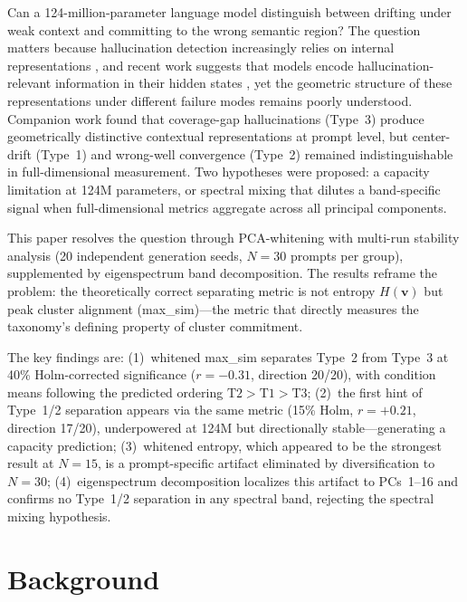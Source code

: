 \documentclass[11pt]{article}
\newcommand{\Hv}{H(\mathbf{v})}
\begin{document}
Can a 124-million-parameter language model distinguish between drifting under weak context and committing to the wrong semantic region? The question matters because hallucination detection increasingly relies on internal representations \citep{tonmoy2024comprehensive, zhang2023siren, kadavath2022language}, and recent work suggests that models encode hallucination-relevant information in their hidden states \citep{duan2024llmsknow}, yet the geometric structure of these representations under different failure modes remains poorly understood. Companion work \citep{author2026induction} found that coverage-gap hallucinations (Type~3) produce geometrically distinctive contextual representations at prompt level, but center-drift (Type~1) and wrong-well convergence (Type~2) remained indistinguishable in full-dimensional measurement. Two hypotheses were proposed: a capacity limitation at 124M parameters, or spectral mixing that dilutes a band-specific signal when full-dimensional metrics aggregate across all principal components.

This paper resolves the question through PCA-whitening with multi-run stability analysis (20 independent generation seeds, $N = 30$ prompts per group), supplemented by eigenspectrum band decomposition. The results reframe the problem: the theoretically correct separating metric is not entropy $\Hv$ but peak cluster alignment (max\_sim)---the metric that directly measures the taxonomy's defining property of cluster commitment.

The key findings are: (1)~whitened max\_sim separates Type~2 from Type~3 at 40\% Holm-corrected significance ($r = -0.31$, direction 20/20), with condition means following the predicted ordering $\text{T2} > \text{T1} > \text{T3}$; (2)~the first hint of Type~1/2 separation appears via the same metric (15\% Holm, $r = +0.21$, direction 17/20), underpowered at 124M but directionally stable---generating a capacity prediction; (3)~whitened entropy, which appeared to be the strongest result at $N = 15$, is a prompt-specific artifact eliminated by diversification to $N = 30$; (4)~eigenspectrum decomposition localizes this artifact to PCs~1--16 and confirms no Type~1/2 separation in any spectral band, rejecting the spectral mixing hypothesis.


\section{Background}
\end{document}
